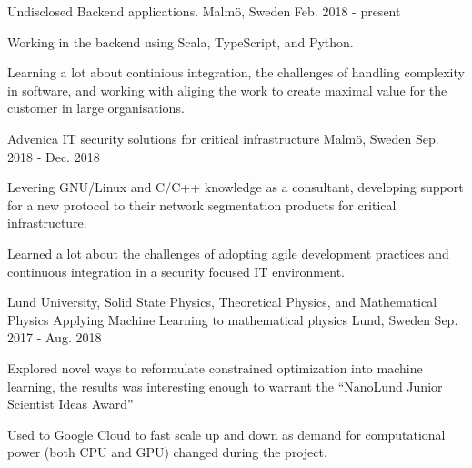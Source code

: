 


\begin{cventries}


\cventry
{Undisclosed} %
{Backend applications.} %
{Malmö, Sweden} %
{Feb. 2018 - present} %
{ %
\begin{cvitems}
\item {Working in the backend using Scala, TypeScript, and Python.}
\item {Learning a lot about continious integration, the challenges
of handling complexity in software, and working with aliging the work to
create maximal value for the customer in large organisations.}
\end{cvitems}
}


\cventry
{Advenica} %
{IT security solutions for critical infrastructure} %
{Malmö, Sweden} %
{Sep. 2018 - Dec. 2018} %
{ %
\begin{cvitems}
\item {Levering GNU/Linux and C/C++ knowledge as a consultant, developing support for a new protocol to their network segmentation products for critical infrastructure.}
\item {Learned a lot about the challenges of adopting agile development practices and continuous
integration in a security focused IT environment.}
\end{cvitems}
}

\cventry
{Lund University, Solid State Physics, Theoretical Physics, and Mathematical Physics} %
{Applying Machine Learning to mathematical physics } %
{Lund, Sweden} %
{Sep. 2017 - Aug. 2018} %
{ %
\begin{cvitems}
\item {Explored novel ways to reformulate constrained optimization into
machine learning, the results was interesting enough to warrant the ``NanoLund Junior Scientist Ideas Award''}
\item {Used to Google Cloud to fast scale up and down as demand for
computational power (both CPU and GPU) changed during the project.}
\end{cvitems}
}


\end{cventries}
